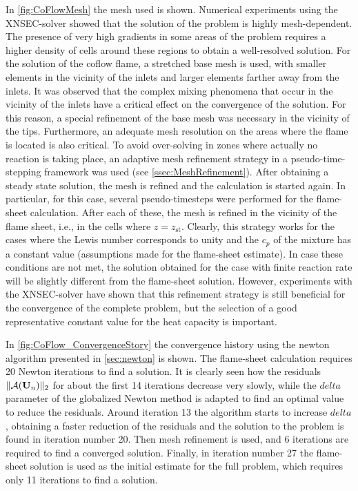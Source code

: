 In \cref{fig:CoFlowMesh} the mesh used is shown. Numerical experiments using the XNSEC-solver showed that the solution of the problem is highly mesh-dependent. The presence of very high gradients in some areas of the problem requires a higher density of cells around these regions to obtain a well-resolved solution. For the solution of the coflow flame, a stretched base mesh is used, with smaller elements in the vicinity of the inlets and larger elements farther away from the inlets. It was observed that the complex mixing phenomena that occur in the vicinity of the inlets have a critical effect on the convergence of the solution. For this reason, a special refinement of the base mesh was necessary in the vicinity of the tips. 
Furthermore, an adequate mesh resolution on the areas where the flame is located is also critical. To avoid over-solving in zones where actually no reaction is taking place, an adaptive mesh refinement strategy in a pseudo-time-stepping framework was used (see \cref{ssec:MeshRefinement}). After obtaining a steady state solution, the mesh is refined and the calculation is started again. In particular, for this case, several pseudo-timesteps were performed for the flame-sheet calculation. After each of these, the mesh is refined in the vicinity of the flame sheet, i.e., in the cells where $z = z_{\text{st}}$. Clearly, this strategy works for the cases where the Lewis number corresponds to unity and the $c_p$ of the mixture has a constant value (assumptions made for the flame-sheet estimate). In case these conditions are not met, the solution obtained for the case with finite reaction rate will be slightly different from the flame-sheet solution.  However, experiments with the XNSEC-solver have shown that this refinement strategy is still beneficial for the convergence of the complete problem, but the selection of a good representative constant value for the heat capacity is important. 

In \cref{fig:CoFlow_ConvergenceStory} the convergence history using the newton algorithm presented in \cref{sec:newton} is shown. The flame-sheet calculation requires 20 Newton iterations to find a solution. It is clearly seen how the residuals $\| \mathcal{A}(\textbf{U}_{n}) \|_2 $  for about the first 14 iterations decrease very slowly, while the $delta$ parameter of the globalized Newton method is adapted to find an optimal value to reduce the residuals. Around iteration 13 the algorithm starts to increase $delta$, obtaining a faster reduction of the residuals and the solution to the problem is found in iteration number 20. Then mesh refinement is used, and 6 iterations are required to find a converged solution. Finally, in iteration number 27 the flame-sheet solution is used as the initial estimate for the full problem, which requires only 11 iterations to find a solution. 

